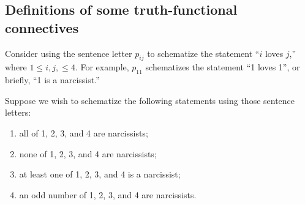 \subsection{Definitions of some truth-functional connectives}
Consider using the sentence letter $p_{ij}$ to schematize the statement ``$i$ loves $j$,'' where $1\leq i,j,\leq 4$. For example, $p_{11}$ schematizes the statement ``1 loves 1'', or briefly, ``1 is a narcissist.'' 

Suppose we wish to schematize the following statements using those sentence letters: 

\begin{enumerate}
\item all of 1, 2, 3, and 4 are narcissists;\label{allnar}
\item none of 1, 2, 3, and 4 are narcissists;\label{nonar}
\item at least one of 1, 2, 3, and 4 is a narcissist;\label{onenar}
\item an odd number of 1, 2, 3, and 4 are narcissists.\label{oddnar}
\end{enumerate} 


